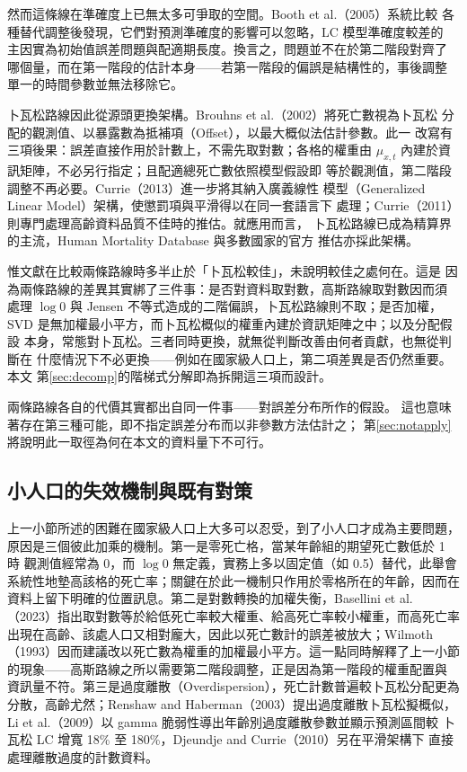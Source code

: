 \documentclass[UTF8, fontset=macnew, a4paper, 12pt]{ctexart}
\begin{document}
然而這條線在準確度上已無太多可爭取的空間。Booth et al.（2005）系統比較
各種替代調整後發現，它們對預測準確度的影響可以忽略，LC 模型準確度較差的
主因實為初始值誤差問題與配適期長度。換言之，問題並不在於第二階段對齊了
哪個量，而在第一階段的估計本身——若第一階段的偏誤是結構性的，事後調整
單一的時間參數並無法移除它。

卜瓦松路線因此從源頭更換架構。Brouhns et al.（2002）將死亡數視為卜瓦松
分配的觀測值、以暴露數為抵補項（Offset），以最大概似法估計參數。此一
改寫有三項後果：誤差直接作用於計數上，不需先取對數；各格的權重由
$\mu_{x,t}$ 內建於資訊矩陣，不必另行指定；且配適總死亡數依照模型假設即
等於觀測值，第二階段調整不再必要。Currie（2013）進一步將其納入廣義線性
模型（Generalized Linear Model）架構，使懲罰項與平滑得以在同一套語言下
處理；Currie（2011）則專門處理高齡資料品質不佳時的推估。就應用而言，
卜瓦松路線已成為精算界的主流，Human Mortality Database 與多數國家的官方
推估亦採此架構。

惟文獻在比較兩條路線時多半止於「卜瓦松較佳」，未說明較佳之處何在。這是
因為兩條路線的差異其實綁了三件事：是否對資料取對數，高斯路線取對數因而須
處理 $\log 0$ 與 Jensen 不等式造成的二階偏誤，卜瓦松路線則不取；是否加權，
SVD 是無加權最小平方，而卜瓦松概似的權重內建於資訊矩陣之中；以及分配假設
本身，常態對卜瓦松。三者同時更換，就無從判斷改善由何者貢獻，也無從判斷在
什麼情況下不必更換——例如在國家級人口上，第二項差異是否仍然重要。本文
第\ref{sec:decomp}的階梯式分解即為拆開這三項而設計。

兩條路線各自的代價其實都出自同一件事——對誤差分布所作的假設。
這也意味著存在第三種可能，即不指定誤差分布而以非參數方法估計之；
第\ref{sec:notapply}將說明此一取徑為何在本文的資料量下不可行。

\subsection{小人口的失效機制與既有對策}

上一小節所述的困難在國家級人口上大多可以忍受，到了小人口才成為主要問題，
原因是三個彼此加乘的機制。第一是零死亡格，當某年齡組的期望死亡數低於 1 時
觀測值經常為 0，而 $\log 0$ 無定義，實務上多以固定值（如 0.5）替代，此舉會
系統性地墊高該格的死亡率；關鍵在於此一機制只作用於零格所在的年齡，因而在
資料上留下明確的位置訊息。第二是對數轉換的加權失衡，Basellini et al.
（2023）指出取對數等於給低死亡率較大權重、給高死亡率較小權重，而高死亡率
出現在高齡、該處人口又相對龐大，因此以死亡數計的誤差被放大；Wilmoth
（1993）因而建議改以死亡數為權重的加權最小平方。這一點同時解釋了上一小節
的現象——高斯路線之所以需要第二階段調整，正是因為第一階段的權重配置與
資訊量不符。第三是過度離散（Overdispersion），死亡計數普遍較卜瓦松分配更為
分散，高齡尤然；Renshaw and Haberman（2003）提出過度離散卜瓦松擬概似，
Li et al.（2009）以 gamma 脆弱性導出年齡別過度離散參數並顯示預測區間較
卜瓦松 LC 增寬 18\% 至 180\%，Djeundje and Currie（2010）另在平滑架構下
直接處理離散過度的計數資料。
\end{document}
